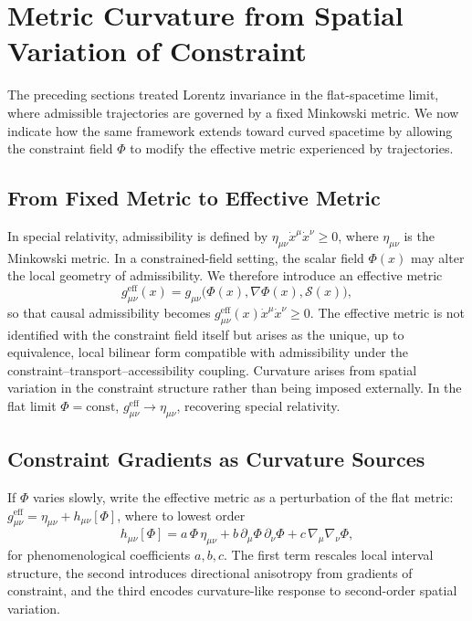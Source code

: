 \documentclass[11pt, a4paper, twocolumn]{article}
\newcommand{\Sfield}{\mathcal{S}}
\begin{document}
\section{Metric Curvature from Spatial Variation of Constraint}

The preceding sections treated Lorentz invariance in the flat-spacetime limit,
where admissible trajectories are governed by a fixed Minkowski metric. We now
indicate how the same framework extends toward curved spacetime by allowing the
constraint field $\Phi$ to modify the effective metric experienced by
trajectories.

\subsection{From Fixed Metric to Effective Metric}

In special relativity, admissibility is defined by
$\eta_{\mu\nu}\dot{x}^\mu\dot{x}^\nu \geq 0$, where $\eta_{\mu\nu}$ is the
Minkowski metric. In a constrained-field setting, the scalar field $\Phi(x)$ may
alter the local geometry of admissibility. We therefore introduce an effective
metric
\[
    g_{\mu\nu}^{\mathrm{eff}}(x)
    =
    g_{\mu\nu}\bigl(\Phi(x),\nabla\Phi(x),\Sfield(x)\bigr),
\]
so that causal admissibility becomes
$g_{\mu\nu}^{\mathrm{eff}}(x)\dot{x}^\mu\dot{x}^\nu \geq 0$. The effective
metric is not identified with the constraint field itself but arises as the
unique, up to equivalence, local bilinear form compatible with admissibility
under the constraint--transport--accessibility coupling. Curvature arises from
spatial variation in the constraint structure rather than being imposed
externally. In the flat limit $\Phi = \mathrm{const}$,
$g_{\mu\nu}^{\mathrm{eff}} \to \eta_{\mu\nu}$, recovering special relativity.

\subsection{Constraint Gradients as Curvature Sources}

If $\Phi$ varies slowly, write the effective metric as a perturbation of the
flat metric: $g_{\mu\nu}^{\mathrm{eff}} = \eta_{\mu\nu} + h_{\mu\nu}[\Phi]$,
where to lowest order
\[
    h_{\mu\nu}[\Phi]
    =
    a\,\Phi\,\eta_{\mu\nu}
    +
    b\,\partial_\mu\Phi\,\partial_\nu\Phi
    +
    c\,\nabla_\mu\nabla_\nu\Phi,
\]
for phenomenological coefficients $a,b,c$. The first term rescales local
interval structure, the second introduces directional anisotropy from gradients
of constraint, and the third encodes curvature-like response to second-order
spatial variation.
\end{document}
